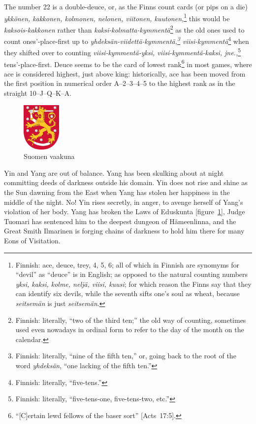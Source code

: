 \documentclass[letterpaper]{article}
\begin{document}
The number 22 is a double-deuce, or, as the Finns count cards (or pips on a die) \foreignlanguage{finnish}{\textit{ykk{\"o}nen, kakkonen, kolmonen, nelonen, viitonen, kuutonen,}}\footnote{Finnish: ace, deuce, trey, 4, 5, 6; all of which in Finnish are synomyms for ``devil'' as ``deuce'' is in English; as opposed to the natural counting numbers \foreignlanguage{finnish}{\textit{yksi, kaksi, kolme, nelj{\"a}, viisi, kuusi};} for which reason the Finns say that they can identify six devils, while the seventh sifts one's soul as wheat, because \foreignlanguage{finnish}{\textit{seitsem{\"a}n}} is just \foreignlanguage{finnish}{\textit{seitsem{\"a}n}}.} this would be \foreignlanguage{finnish}{\textit{kaksois-kakkonen}} rather than \foreignlanguage{finnish}{\textit{kaksi-kolmatta-kymment{\"a}}}\footnote{Finnish: literally, ``two of the third ten;'' the old way of counting, sometimes used even nowadays in ordinal form to refer to the day of the month on the calendar.} as the old ones used to count ones'-place-first up to \foreignlanguage{finnish}{\textit{yhdeks{\"a}n-viidett{\"a}-kymment{\"a},\footnote{Finnish: literally, ``nine of the fifth ten,'' or, going back to the root of the word \foreignlanguage{finnish}{\textit{yhdeks{\"a}n}}, ``one lacking of the fifth ten.''} viisi-kymment{\"a}}}\footnote{Finnish: literally, ``five-tens.''} when they shifted over to counting \foreignlanguage{finnish}{\textit{viisi-kymment{\"a}-yksi, viisi-kymment{\"a}-kaksi, jne.,}}\footnote{Finnish: literally, ``five-tens-one, five-tens-two, etc.''} tens'-place-first.  Deuce seems to be the card of lowest rank\footnote{``[C]ertain lewd fellows of the baser sort'' [Acts~17:5].} in most games, where ace is considered highest, just above king: historically, ace has been moved from the first position in numerical order \mbox{A--2--3--4--5} to the highest rank as in the straight \mbox{10--J--Q--K--A}.

\begin{figure}
	\centering
	\includegraphics[width=0.75in]{images/Coat_of_arms_of_Finland.png}
	\caption{Suomen vaakuna}
	\label{eduskunta}
\end{figure}
Yin and Yang are out of balance.  Yang has been skulking about at night committing deeds of darkness outside his domain.  Yin does not rise and shine as the Sun dawning from the East when Yang has stolen her happiness in the middle of the night.  No!  Yin rises secretly, in anger, to avenge herself of Yang's violation of her body.  Yang has broken the Laws of \foreignlanguage{finnish}{Eduskunta} [figure~\ref{eduskunta}],
Judge \foreignlanguage{finnish}{Tuomari} has sentenced him to the deepest dungeon of \foreignlanguage{finnish}{H{\"a}meenlinna}, and the Great Smith \foreignlanguage{finnish}{Ilmarinen} \cite{lonnrot1849kalevala,crawford1888kalevala} is forging chains of darkness to hold him there for many Eons of Visitation.
\end{document}
